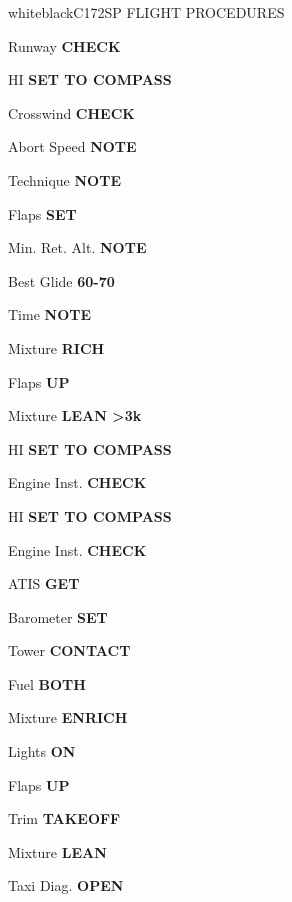 \documentclass{article}
\begin{document}
\begin{groupheading}{white}{black}{C172SP FLIGHT PROCEDURES}
\end{groupheading}
\begin{multicols*}{3}

\colorbox{green!80!red}{}

Runway \dotfill \textbf{CHECK}

HI \dotfill \textbf{SET TO COMPASS}

Crosswind \dotfill \textbf{CHECK}

Abort Speed \dotfill \textbf{NOTE}

Technique \dotfill \textbf{NOTE}

Flaps \dotfill \textbf{SET}

Min. Ret. Alt. \dotfill \textbf{NOTE}

Best Glide \dotfill \textbf{60-70}

Time \dotfill \textbf{NOTE}

Mixture \dotfill \textbf{RICH}

\colorbox{green!80!red}{}

Flaps \dotfill \textbf{UP}

Mixture \dotfill \textbf{LEAN >3k}

HI \dotfill \textbf{SET TO COMPASS}

Engine Inst. \dotfill \textbf{CHECK}

\colorbox{green!80!red}{}

HI \dotfill \textbf{SET TO COMPASS}

Engine Inst. \dotfill \textbf{CHECK}

ATIS \dotfill \textbf{GET}

Barometer \dotfill \textbf{SET}

Tower \dotfill \textbf{CONTACT}

Fuel \dotfill \textbf{BOTH}

Mixture \dotfill \textbf{ENRICH}

Lights \dotfill \textbf{ON}

\colorbox{green!80!red}{}

Flaps \dotfill \textbf{UP}

Trim \dotfill \textbf{TAKEOFF}

Mixture \dotfill \textbf{LEAN}

Taxi Diag. \dotfill \textbf{OPEN}


\end{multicols*}
\end{document}
